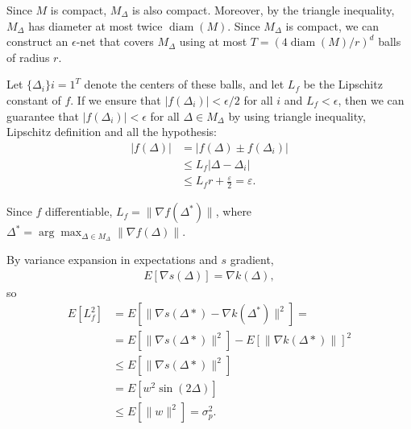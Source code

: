 \begin{frame}

Since $M$ is compact, $M_\Delta$ is also compact. Moreover, by the triangle inequality, $M_\Delta$ has diameter at most twice $\operatorname{diam}(M)$. Since $M_\Delta$ is compact, we can construct an $\epsilon$-net that covers $M_\Delta$ using at most $T = (4\operatorname{diam}(M)/r)^d$ balls of radius $r$.

Let $\{\Delta_i\}{i=1}^T$ denote the centers of these balls, 
and let $L_f$ be the Lipschitz constant of $f$. 
If we ensure that $|f(\Delta_i)| < \epsilon/2$ for all $i$ and $L_f < \epsilon$, 
then we can guarantee that
 $|f(\Delta_i)| < \epsilon$ for all $\Delta \in M_\Delta$ 
by using triangle inequality, Lipschitz definition and all the hypothesis: 
\begin{align}
    \left|f \left( \Delta\right) \right|
    & =
    \left|
        f \left( \Delta\right) 
        \pm
        f \left( \Delta_i \right) 
    \right|
    \\
    & \leq
    L_f \left| \Delta -  \Delta_i \right|
    \\ & \leq
    L_f r + \frac{\varepsilon}{2} = \varepsilon. 
\end{align}

\end{frame}

\begin{frame}

Since $f$ differentiable, 
$L_f = \|\nabla f(\Delta^*)\|$, where 
$\Delta^* = \arg \max_{\Delta \in M_\Delta} \|\nabla f(\Delta)\|$.

By variance expansion in expectations and $s$ gradient, 
\begin{align}
    E[\nabla s(\Delta)]
    = 
    \nabla k(\Delta),
\end{align}
so 
\begin{align}
    E[L_f^2]
    & =
    E\left[
        \|
        \nabla s(\Delta*)
        -
        \nabla k(\Delta^*)\|^2
    \right]
    = 
    \\
    & = 
    E\left[
        \|
        \nabla s(\Delta*)
       \|^2
    \right]
    -
    E\left[
        \|
        \nabla k(\Delta*)
       \|
    \right]^2
    \\
    &
    \leq 
    E\left[
        \|
        \nabla s(\Delta*)
       \|^2
    \right]
    \\
    &
    =  
    E\left[
        w^2 \sin(2 \Delta)
    \right]
    \\
    &
    \leq 
    E\left[
        \|
        w
       \|^2
    \right]
    = \sigma^2_p.
\end{align}

\end{frame}


